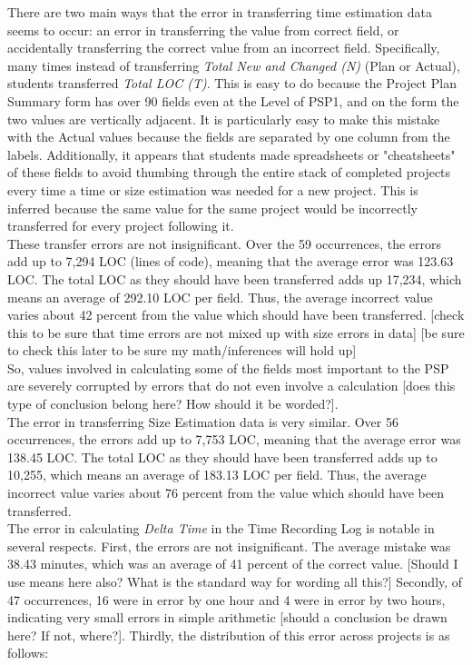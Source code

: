 There are two main ways that the error in transferring time estimation 
data
seems to occur: an error in transferring the value from
correct field, or accidentally transferring the correct value from
an incorrect field.  Specifically, many times instead of transferring
{\it Total New and Changed (N)} (Plan or Actual), students transferred
{\it Total LOC (T)}.  This is easy to do
because the Project Plan Summary form has over 90 fields even
at the Level of PSP1, and on the form the two values are vertically
adjacent. It is particularly easy to make this mistake with the Actual
values because the fields are separated by one column from the labels.
Additionally, it appears that students made spreadsheets or 
"cheatsheets"
of these fields to avoid thumbing through the entire stack of completed
projects every time a time or size estimation was needed for a new
project.  This is inferred because the same value for the same project
would be incorrectly transferred for every project following it.\\

These transfer errors are not insignificant.  Over the 59 occurrences,
the errors add up to 7,294 LOC (lines of code), meaning that the average 
error
was 123.63 LOC.  The total LOC as they should have
been transferred adds up 17,234, which means an average of 292.10
LOC per field.  Thus, the average incorrect value varies about 42 
percent from
the value which should have been transferred.
[check this to be sure that time errors are not mixed up with size 
errors
 in data]
[be sure to check this later to be sure my math/inferences will hold 
up]\\

So, values involved in calculating some of the fields most important to
the PSP are severely corrupted by errors that do not even involve a
calculation [does this type of conclusion belong here?  How should it
be worded?]. \\

The error in transferring Size Estimation data is very similar.
Over 56 occurrences, the errors add up to 7,753 LOC, meaning that the
average error was 138.45 LOC. The total LOC as they should have been
transferred adds up to 10,255, which means an average of 183.13 LOC
per field.  Thus, the average incorrect value varies about 76 percent 
from
the value which should have been transferred. \\

The error in calculating {\it Delta Time} in the Time Recording Log is
notable in several respects.  First, the errors are not insignificant.
The average mistake was 38.43 minutes, which was an average of 41 
percent of
the correct value. [Should I use means here also?  What is the standard 
way
for wording all this?] Secondly, of 47 occurrences, 16 were in error by
one hour and 4 were in error by two hours, indicating very small errors
in simple arithmetic [should a conclusion be drawn here?  If not, 
where?]. 
Thirdly, the distribution of this error across projects is as follows: 
\\ \\

